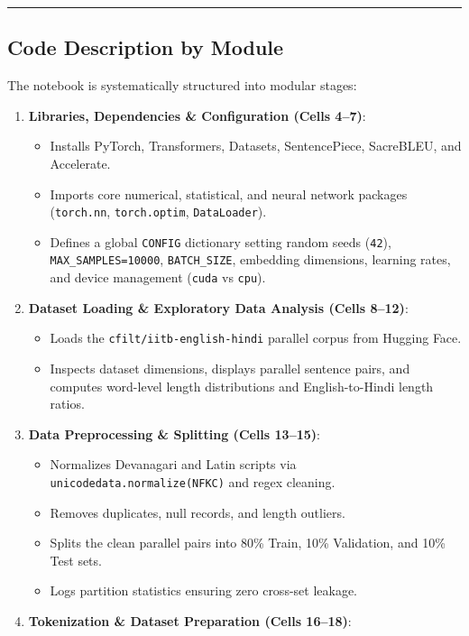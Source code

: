 \documentclass[12pt,a4paper,oneside]{report}
\providecommand{\tightlist}{\setlength{\itemsep}{0pt}\setlength{\parskip}{0pt}}
\begin{document}
\begin{center}\rule{0.5\linewidth}{0.5pt}\end{center}

\hypertarget{code-description-by-module}{%
\subsection{Code Description by Module}\label{code-description-by-module}}

The notebook is systematically structured into modular stages:

\begin{enumerate}
\def\labelenumi{\arabic{enumi}.}
\tightlist
\item
  \textbf{Libraries, Dependencies \& Configuration (Cells 4--7)}:

  \begin{itemize}
  \tightlist
  \item
    Installs PyTorch, Transformers, Datasets, SentencePiece, SacreBLEU, and Accelerate.
  \item
    Imports core numerical, statistical, and neural network packages (\texttt{torch.nn}, \texttt{torch.optim}, \texttt{DataLoader}).
  \item
    Defines a global \texttt{CONFIG} dictionary setting random seeds (\texttt{42}), \texttt{MAX\_SAMPLES=10000}, \texttt{BATCH\_SIZE}, embedding dimensions, learning rates, and device management (\texttt{cuda} vs \texttt{cpu}).
  \end{itemize}
\item
  \textbf{Dataset Loading \& Exploratory Data Analysis (Cells 8--12)}:

  \begin{itemize}
  \tightlist
  \item
    Loads the \texttt{cfilt/iitb-english-hindi} parallel corpus from Hugging Face.
  \item
    Inspects dataset dimensions, displays parallel sentence pairs, and computes word-level length distributions and English-to-Hindi length ratios.
  \end{itemize}
\item
  \textbf{Data Preprocessing \& Splitting (Cells 13--15)}:

  \begin{itemize}
  \tightlist
  \item
    Normalizes Devanagari and Latin scripts via \texttt{unicodedata.normalize(\textquotesingle{}NFKC\textquotesingle{})} and regex cleaning.
  \item
    Removes duplicates, null records, and length outliers.
  \item
    Splits the clean parallel pairs into 80\% Train, 10\% Validation, and 10\% Test sets.
  \item
    Logs partition statistics ensuring zero cross-set leakage.
  \end{itemize}
\item
  \textbf{Tokenization \& Dataset Preparation (Cells 16--18)}:


\end{enumerate}
\end{document}
